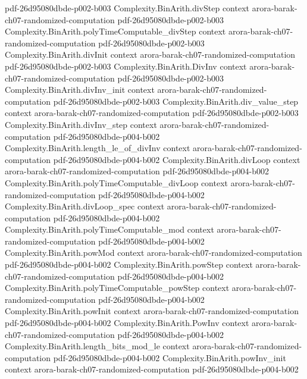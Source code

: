\begin{theorem}
  {pdf-26d95080dbde-p002-b003}
\proofstep
  {Complexity.BinArith.divStep}
  {context}
  {arora-barak-ch07-randomized-computation}
  {pdf-26d95080dbde-p002-b003}
\proofstep
  {Complexity.BinArith.polyTimeComputable_divStep}
  {context}
  {arora-barak-ch07-randomized-computation}
  {pdf-26d95080dbde-p002-b003}
\proofstep
  {Complexity.BinArith.divInit}
  {context}
  {arora-barak-ch07-randomized-computation}
  {pdf-26d95080dbde-p002-b003}
\proofstep
  {Complexity.BinArith.DivInv}
  {context}
  {arora-barak-ch07-randomized-computation}
  {pdf-26d95080dbde-p002-b003}
\proofstep
  {Complexity.BinArith.divInv_init}
  {context}
  {arora-barak-ch07-randomized-computation}
  {pdf-26d95080dbde-p002-b003}
\proofstep
  {Complexity.BinArith.div_value_step}
  {context}
  {arora-barak-ch07-randomized-computation}
  {pdf-26d95080dbde-p002-b003}
\proofstep
  {Complexity.BinArith.divInv_step}
  {context}
  {arora-barak-ch07-randomized-computation}
  {pdf-26d95080dbde-p004-b002}
\proofstep
  {Complexity.BinArith.length_le_of_divInv}
  {context}
  {arora-barak-ch07-randomized-computation}
  {pdf-26d95080dbde-p004-b002}
\proofstep
  {Complexity.BinArith.divLoop}
  {context}
  {arora-barak-ch07-randomized-computation}
  {pdf-26d95080dbde-p004-b002}
\proofstep
  {Complexity.BinArith.polyTimeComputable_divLoop}
  {context}
  {arora-barak-ch07-randomized-computation}
  {pdf-26d95080dbde-p004-b002}
\proofstep
  {Complexity.BinArith.divLoop_spec}
  {context}
  {arora-barak-ch07-randomized-computation}
  {pdf-26d95080dbde-p004-b002}
\proofstep
  {Complexity.BinArith.polyTimeComputable_mod}
  {context}
  {arora-barak-ch07-randomized-computation}
  {pdf-26d95080dbde-p004-b002}
\proofstep
  {Complexity.BinArith.powMod}
  {context}
  {arora-barak-ch07-randomized-computation}
  {pdf-26d95080dbde-p004-b002}
\proofstep
  {Complexity.BinArith.powStep}
  {context}
  {arora-barak-ch07-randomized-computation}
  {pdf-26d95080dbde-p004-b002}
\proofstep
  {Complexity.BinArith.polyTimeComputable_powStep}
  {context}
  {arora-barak-ch07-randomized-computation}
  {pdf-26d95080dbde-p004-b002}
\proofstep
  {Complexity.BinArith.powInit}
  {context}
  {arora-barak-ch07-randomized-computation}
  {pdf-26d95080dbde-p004-b002}
\proofstep
  {Complexity.BinArith.PowInv}
  {context}
  {arora-barak-ch07-randomized-computation}
  {pdf-26d95080dbde-p004-b002}
\proofstep
  {Complexity.BinArith.length_bits_mod_le}
  {context}
  {arora-barak-ch07-randomized-computation}
  {pdf-26d95080dbde-p004-b002}
\proofstep
  {Complexity.BinArith.powInv_init}
  {context}
  {arora-barak-ch07-randomized-computation}
  {pdf-26d95080dbde-p004-b002}

\end{theorem}
